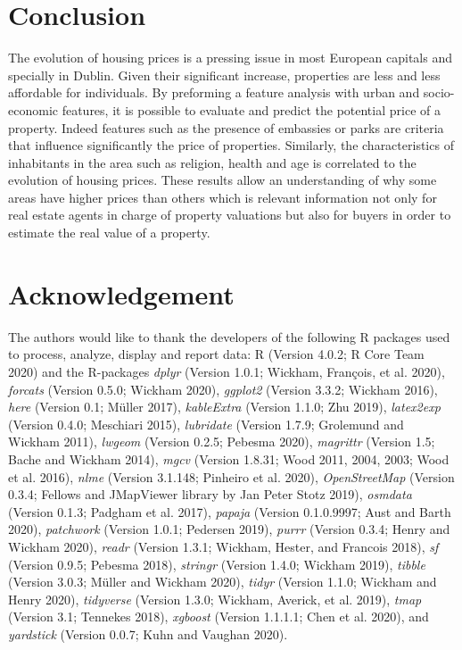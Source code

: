 \documentclass[conference,final,]{IEEEtran}
\begin{document}
\hypertarget{conclusion}{%
\section{Conclusion}\label{conclusion}}

The evolution of housing prices is a pressing issue in most European capitals and specially in Dublin. Given their significant increase, properties are less and less affordable for individuals. By preforming a feature analysis with urban and socio-economic features, it is possible to evaluate and predict the potential price of a property. Indeed features such as the presence of embassies or parks are criteria that influence significantly the price of properties. Similarly, the characteristics of inhabitants in the area such as religion, health and age is correlated to the evolution of housing prices. These results allow an understanding of why some areas have higher prices than others which is relevant information not only for real estate agents in charge of property valuations but also for buyers in order to estimate the real value of a property.

\hypertarget{acknowledgement}{%
\section{Acknowledgement}\label{acknowledgement}}

The authors would like to thank the developers of the following R packages used to process, analyze, display and report data: R (Version 4.0.2; R Core Team 2020) and the R-packages \emph{dplyr} (Version 1.0.1; Wickham, François, et al. 2020), \emph{forcats} (Version 0.5.0; Wickham 2020), \emph{ggplot2} (Version 3.3.2; Wickham 2016), \emph{here} (Version 0.1; Müller 2017), \emph{kableExtra} (Version 1.1.0; Zhu 2019), \emph{latex2exp} (Version 0.4.0; Meschiari 2015), \emph{lubridate} (Version 1.7.9; Grolemund and Wickham 2011), \emph{lwgeom} (Version 0.2.5; Pebesma 2020), \emph{magrittr} (Version 1.5; Bache and Wickham 2014), \emph{mgcv} (Version 1.8.31; Wood 2011, 2004, 2003; Wood et al. 2016), \emph{nlme} (Version 3.1.148; Pinheiro et al. 2020), \emph{OpenStreetMap} (Version 0.3.4; Fellows and JMapViewer library by Jan Peter Stotz 2019), \emph{osmdata} (Version 0.1.3; Padgham et al. 2017), \emph{papaja} (Version 0.1.0.9997; Aust and Barth 2020), \emph{patchwork} (Version 1.0.1; Pedersen 2019), \emph{purrr} (Version 0.3.4; Henry and Wickham 2020), \emph{readr} (Version 1.3.1; Wickham, Hester, and Francois 2018), \emph{sf} (Version 0.9.5; Pebesma 2018), \emph{stringr} (Version 1.4.0; Wickham 2019), \emph{tibble} (Version 3.0.3; Müller and Wickham 2020), \emph{tidyr} (Version 1.1.0; Wickham and Henry 2020), \emph{tidyverse} (Version 1.3.0; Wickham, Averick, et al. 2019), \emph{tmap} (Version 3.1; Tennekes 2018), \emph{xgboost} (Version 1.1.1.1; Chen et al. 2020), and \emph{yardstick} (Version 0.0.7; Kuhn and Vaughan 2020).
\end{document}
